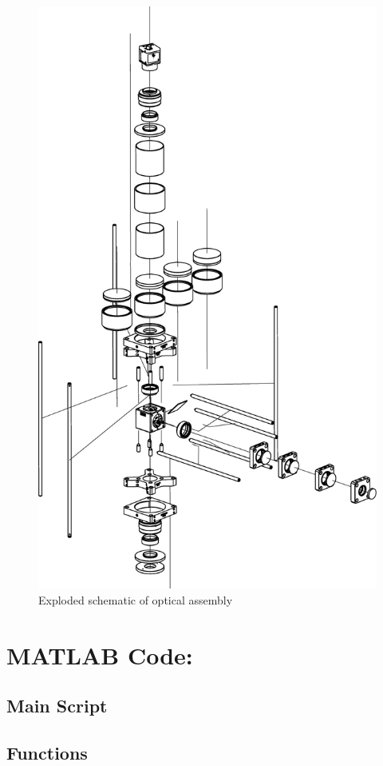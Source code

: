 \documentclass{article}
\begin{document}
\begin{figure}[!h]
    \centering
    \includegraphics[width = 0.5\columnwidth]{optics_assembly_illustrated_exploded.eps}
    \caption{Exploded schematic of optical assembly}
    \label{fig:my_label}
\end{figure}


\section{MATLAB Code:}
    \subsection{Main Script}
        
    \subsection{Functions}
        
\end{document}
